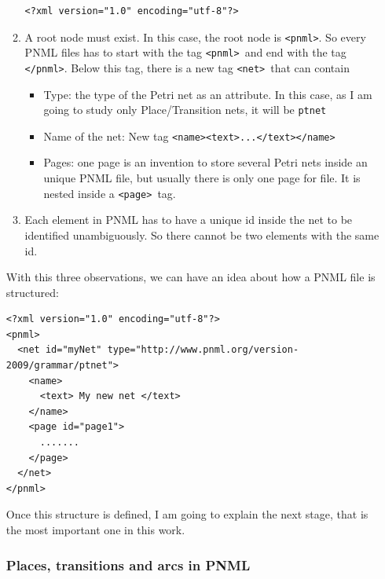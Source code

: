 \begin{enumerate}
\begin{enumerate}
\begin{lstlisting}
<?xml version="1.0" encoding="utf-8"?>
\end{lstlisting}
  
 
\item
  A root node must exist.
  In this case, the root node is \texttt{\textless pnml\textgreater}.
  So every PNML files has to start with the tag \texttt{\textless pnml\textgreater}\   and end with the tag \texttt{\textless/pnml\textgreater}.
Below this tag, there is a new tag \texttt{\textless net\textgreater}\ that can contain
  \begin{itemize}
  \item Type: the type of the Petri net as an attribute. In this case, as
    I  am going to study only Place/Transition nets, it will  be \texttt{ptnet}
  \item Name of the net: New tag \texttt{\textless name\textgreater\textless text\textgreater...\textless/text\textgreater\textless/name\textgreater}
  \item Pages: one page is an invention to store several Petri nets inside
  an unique PNML file, but usually there is only one page for file. It is
  nested inside a \texttt{\textless page\textgreater}\ tag.
  \end{itemize}
  \item
  Each element in PNML has to have a unique id inside the net to be identified
unambiguously. So there cannot
  be two elements with the same id.
\end{enumerate}

 

With this three observations, we can have an idea about how a PNML file
is structured:  

 
\begin{lstlisting}[label=pnml_net_page,caption=Example of general PNML file]
<?xml version="1.0" encoding="utf-8"?>
<pnml>
  <net id="myNet" type="http://www.pnml.org/version-2009/grammar/ptnet">
    <name>
      <text> My new net </text>
    </name>
    <page id="page1">
      .......
    </page>
  </net>
</pnml>
\end{lstlisting}

Once this structure is defined, I am going to explain the next stage, that
is the most important one in this work. 

\subsubsection{Places, transitions and arcs in PNML}


\end{enumerate}
